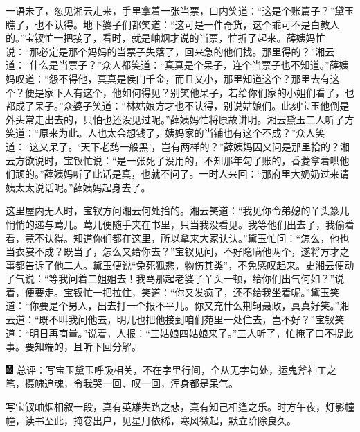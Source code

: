 一语未了，忽见湘云走来，手里拿着一张当票，口内笑道：``这是个账篇子？''黛玉瞧了，也不认得。地下婆子们都笑道：``这可是一件奇货，这个乖可不是白教人的。''宝钗忙一把接了，看时，就是岫烟才说的当票，忙折了起来。薛姨妈忙说：``那必定是那个妈妈的当票子失落了，回来急的他们找。那里得的？''湘云道：``什么是当票子？''众人都笑道：``真真是个呆子，连个当票子也不知道。''薛姨妈叹道：``怨不得他，真真是侯门千金，而且又小，那里知道这个？那里去有这个？便是家下人有这个，他如何得见？别笑他呆子，若给你们家的小姐们看了，也都成了呆子。''众婆子笑道：``林姑娘方才也不认得，别说姑娘们。此刻宝玉他倒是外头常走出去的，只怕也还没见过呢。''薛姨妈忙将原故讲明。湘云黛玉二人听了方笑道：``原来为此。人也太会想钱了，姨妈家的当铺也有这个不成？''众人笑道：``这又呆了。`天下老鸹一般黑'，岂有两样的？''薛姨妈因又问是那里拾的？湘云方欲说时，宝钗忙说：``是一张死了没用的，不知那年勾了账的，香菱拿着哄他们顽的。''薛姨妈听了此话是真，也就不问了。一时人来回：``那府里大奶奶过来请姨太太说话呢。''薛姨妈起身去了。

这里屋内无人时，宝钗方问湘云何处拾的。湘云笑道：``我见你令弟媳的丫头篆儿悄悄的递与莺儿。莺儿便随手夹在书里，只当我没看见。我等他们出去了，我偷着看，竟不认得。知道你们都在这里，所以拿来大家认认。''黛玉忙问：``怎么，他也当衣裳不成？既当了，怎么又给你去？''宝钗见问，不好隐瞒他两个，遂将方才之事都告诉了他二人。黛玉便说``兔死狐悲，物伤其类''，不免感叹起来。史湘云便动了气说：``等我问着二姐姐去！我骂那起老婆子丫头一顿，给你们出气何如？''说着，便要走。宝钗忙一把拉住，笑道：``你又发疯了，还不给我坐着呢。''黛玉笑道：``你要是个男人，出去打一个报不平儿。你又充什么荆轲聂政，真真好笑。''湘云道：``既不叫我问他去，明儿也把他接到咱们苑里一处住去，岂不好？''宝钗笑道：``明日再商量。''说着，人报：``三姑娘四姑娘来了。''三人听了，忙掩了口不提此事。要知端的，且听下回分解。

{\includegraphics[width=3mm]{../Images/00005}  \kaishu 总评：写宝玉黛玉呼吸相关，不在字里行间，全从无字句处，运鬼斧神工之笔，摄魄追魂，令我哭一回、叹一回，浑身都是呆气。}

{写宝钗岫烟相叙一段，真有英雄失路之悲，真有知己相逢之乐。时方午夜，灯影幢幢，读书至此，掩卷出户，见星月依稀，寒风微起，默立阶除良久。}

